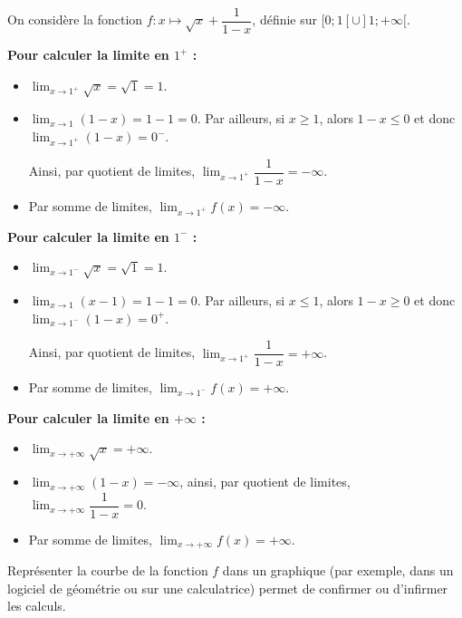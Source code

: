 \documentclass[11pt,fleqn, openany]{book} %
\begin{document}
\begin{example} On considère la fonction $f:x\mapsto \sqrt{x} + \dfrac{1}{1-x}$, définie sur $[0;1[ \cup ]1;+\infty[$.

\textbf{Pour calculer la limite en $1^+$ :}
\begin{itemize}
\item $\displaystyle \lim_{x \to 1^+} \sqrt{x} = \sqrt{1}=1$.
\item $\displaystyle \lim_{x \to 1} (1-x)=1-1=0$. Par ailleurs, si $x \geqslant 1$, alors $1-x \leqslant 0$ et donc $\displaystyle \lim_{x \to 1^+} (1-x)=0^-$. 

Ainsi, par quotient de limites, $\displaystyle \lim_{x \to 1^+} \dfrac{1}{1-x}=-\infty$.
\item Par somme de limites, $\displaystyle \lim_{x \to 1^+} f(x)=-\infty$.

\end{itemize}


\textbf{Pour calculer la limite en $1^-$ :}
\begin{itemize}
\item $\displaystyle \lim_{x \to 1^-} \sqrt{x} = \sqrt{1}=1$.
\item $\displaystyle \lim_{x \to 1} (x-1)=1-1=0$. Par ailleurs, si $x \leqslant 1$, alors $1-x \geqslant 0$ et donc $\displaystyle \lim_{x \to 1^-} (1-x)=0^+$. 

Ainsi, par quotient de limites, $\displaystyle \lim_{x \to 1^+} \dfrac{1}{1-x}=+\infty$.
\item Par somme de limites, $\displaystyle \lim_{x \to 1^-} f(x)=+\infty$.
\end{itemize}

\textbf{Pour calculer la limite en $+\infty$ :}
\begin{itemize}
\item $\displaystyle \lim_{x \to +\infty} \sqrt{x} =+\infty$. 
\item $\displaystyle \lim_{x \to +\infty} (1-x)=-\infty$, ainsi, par quotient de limites, $\displaystyle \lim_{x \to +\infty} \dfrac{1}{1-x}=0$.
\item Par somme de limites, $\displaystyle \lim_{x \to +\infty} f(x)=+\infty$.
\end{itemize}

Représenter la courbe de la fonction $f$ dans un graphique (par exemple, dans un logiciel de géométrie ou sur une calculatrice) permet de confirmer ou d'infirmer les calculs.


\begin{center}
\end{center}
\end{example}
\end{document}
